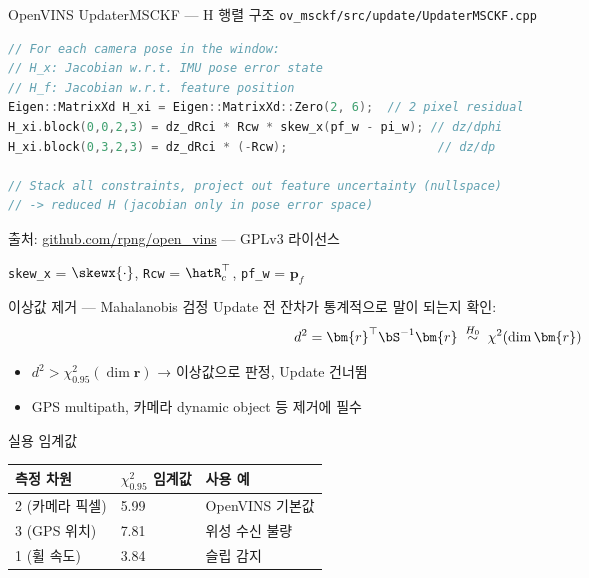 \begin{frame}[fragile]{OpenVINS UpdaterMSCKF — H 행렬 구조}
  \texttt{ov\_msckf/src/update/UpdaterMSCKF.cpp}
\begin{lstlisting}[language=C++, basicstyle=\ttfamily\tiny]
// For each camera pose in the window:
// H_x: Jacobian w.r.t. IMU pose error state
// H_f: Jacobian w.r.t. feature position
Eigen::MatrixXd H_xi = Eigen::MatrixXd::Zero(2, 6);  // 2 pixel residual
H_xi.block(0,0,2,3) = dz_dRci * Rcw * skew_x(pf_w - pi_w); // dz/dphi
H_xi.block(0,3,2,3) = dz_dRci * (-Rcw);                     // dz/dp

// Stack all constraints, project out feature uncertainty (nullspace)
// -> reduced H (jacobian only in pose error space)
\end{lstlisting}
  {\footnotesize 출처: \url{github.com/rpng/open_vins} — GPLv3 라이선스}
  \vspace{0.2em}

  \texttt{skew\_x} = $\skewx{\cdot}$, \texttt{Rcw} = $\hatR_c^\top$, \texttt{pf\_w} = $\bm{p}_f$
\end{frame}

\begin{frame}{이상값 제거 — Mahalanobis 검정}
  Update 전 잔차가 통계적으로 말이 되는지 확인:
  \[
    d^2 = \bm{r}^\top \bS^{-1} \bm{r} \;\overset{H_0}{\sim}\; \chi^2(\dim\bm{r})
  \]
  \pause
  \begin{itemize}
    \item $d^2 > \chi^2_{0.95}(\dim\bm{r})$ → 이상값으로 판정, Update 건너뜀
    \item GPS multipath, 카메라 dynamic object 등 제거에 필수
  \end{itemize}
  \pause
  \vspace{0.3em}
  \begin{block}{실용 임계값}
    \footnotesize
    \begin{tabular}{lll}
      측정 차원 & $\chi^2_{0.95}$ 임계값 & 사용 예 \\
      \hline
      2 (카메라 픽셀) & 5.99 & OpenVINS 기본값 \\
      3 (GPS 위치) & 7.81 & 위성 수신 불량 \\
      1 (휠 속도) & 3.84 & 슬립 감지 \\
    \end{tabular}
  \end{block}
\end{frame}

